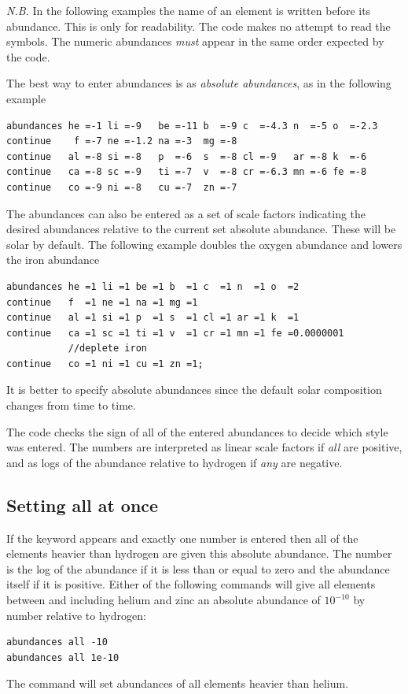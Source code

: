 \emph{N.B.}  In the following examples the name of an element is written
before its abundance.
This is only for readability.  The code makes no attempt
to read the symbols.
The numeric abundances \emph{must} appear in the same order
expected by the code.

The best way to enter abundances is as \emph{absolute abundances},
as in the following example
\begin{verbatim}
abundances he =-1 li =-9   be =-11 b  =-9 c  =-4.3 n  =-5 o  =-2.3
continue    f =-7 ne =-1.2 na =-3  mg =-8
continue   al =-8 si =-8   p  =-6  s  =-8 cl =-9   ar =-8 k  =-6
continue   ca =-8 sc =-9   ti =-7  v  =-8 cr =-6.3 mn =-6 fe =-8
continue   co =-9 ni =-8   cu =-7  zn =-7
\end{verbatim}
The abundances can also be entered as a set of scale factors indicating
the desired abundances relative to the current set absolute abundance.
These will be solar by default.
The following example doubles the oxygen
abundance and lowers the iron abundance
\begin{verbatim}
abundances he =1 li =1 be =1 b  =1 c  =1 n  =1 o  =2
continue   f  =1 ne =1 na =1 mg =1
continue   al =1 si =1 p  =1 s  =1 cl =1 ar =1 k  =1
continue   ca =1 sc =1 ti =1 v  =1 cr =1 mn =1 fe =0.0000001
           //deplete iron
continue   co =1 ni =1 cu =1 zn =1;
\end{verbatim}
It is better to specify absolute abundances since the default solar
composition changes from time to time.

The code checks the sign of all of the entered abundances to decide
which style was entered.
The numbers are interpreted as linear scale factors
if \emph{all} are positive,
and as logs of the abundance relative to hydrogen if
\emph{any} are negative.

\subsection{Setting all at once}

If the keyword  appears and exactly one number
is entered then all
of the elements heavier than hydrogen are given this absolute abundance.
The number is the log of the abundance if it is less than or equal to zero
and the abundance itself if it is positive.
Either of the following commands
will give all elements between and including helium and zinc an absolute
abundance of $10^{-10}$ by number relative to hydrogen:
\begin{verbatim}
abundances all -10
abundances all 1e-10
\end{verbatim}
The  command will set abundances
of all elements heavier than helium.

